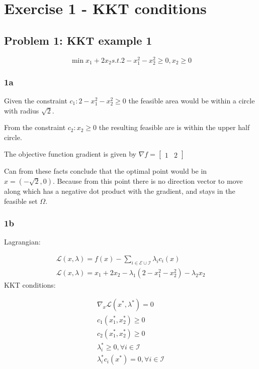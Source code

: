 \section{Exercise 1 - KKT conditions}
\subsection{Problem 1: KKT example 1}

\begin{equation}
    \min x_1+2x_2 s.t. 2-x_1^2-x_2^2 \geq 0, x_2 \geq 0
\end{equation}

\subsubsection{1a}
Given the constraint $c_1: 2-x_1^2-x_2^2 \geq 0$ the feasible area would be within a circle with radius $\sqrt2$.

From the constraint $c_2: x_2 \geq 0$ the resulting feasible are is within the upper half circle.

The objective function gradient is given by $\nabla f = \begin{bmatrix}
    1 & 2
\end{bmatrix}$

Can from these facts conclude that the optimal point would be in $x = (-\sqrt2,0)$. Because from this point there is no direction vector to move along which has a negative dot product with the gradient, and stays in the feasible set $\Omega$.

\subsubsection{1b}
Lagrangian:

\begin{subequations}
    \begin{align}
    \mathcal{L}(x,\lambda) = f(x) - \sum_{i \in \mathcal{E} \cup \mathcal{I}}\lambda_ic_i(x) \\        
    \mathcal{L}(x,\lambda) = x_1 + 2x_2 - \lambda_1 (2-x_1^2-x_2^2) - \lambda_2 x_2
\end{align}
\end{subequations}
KKT conditions:

\begin{subequations}
    \begin{align}
        \nabla_x\mathcal{L}(x^*,\lambda^*) = 0 \\
        c_1(x_1^*,x_2^*) \geq 0 \\ 
        c_2(x_1^*,x_2^*) \geq 0 \\ 
        \lambda_i^* \geq 0 , \forall i \in \mathcal{I} \\ 
        \lambda_i^*c_i(x^*) = 0 , \forall i \in \mathcal{I}
    \end{align}
\end{subequations}


